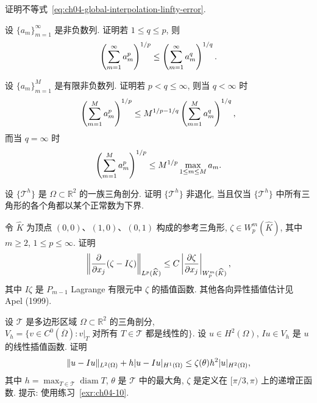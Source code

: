 \begin{MBExercise}
\label{exr:ch04-07}
证明不等式~\eqref{eq:ch04-global-interpolation-linfty-error}.
\end{MBExercise}

\begin{MBExercise}
\label{exr:ch04-08}
设 $\{a_m\}_{m=1}^\infty$ 是非负数列. 证明若 $1\leq q\leq p$, 则
\[
\MathBookFormulaID{formula-ch04-exercise-08-sequence-norm-monotonicity}
\left(\sum_{m=1}^\infty a_m^p\right)^{1/p}
\leq\left(\sum_{m=1}^\infty a_m^q\right)^{1/q}.
\]
\end{MBExercise}

\begin{MBExercise}
\label{exr:ch04-09}
设 $\{a_m\}_{m=1}^M$ 是有限非负数列. 证明若 $p<q\leq\infty$, 则当 $q<\infty$ 时
\[
\MathBookFormulaID{formula-ch04-exercise-09-finite-sequence-lp-lq}
\left(\sum_{m=1}^Ma_m^p\right)^{1/p}
\leq M^{1/p-1/q}\left(\sum_{m=1}^Ma_m^q\right)^{1/q},
\]
而当 $q=\infty$ 时
\[
\MathBookFormulaID{formula-ch04-exercise-09-finite-sequence-lp-linfty}
\left(\sum_{m=1}^Ma_m^p\right)^{1/p}
\leq M^{1/p}\max_{1\leq m\leq M}a_m.
\]
\end{MBExercise}

\begin{MBExercise}[最小角条件]
\label{exr:ch04-10}
设 $\{\mathcal T^h\}$ 是 $\Omega\subset\mathbb R^2$ 的一族三角剖分. 证明 $\{\mathcal T^h\}$ 非退化, 当且仅当 $\{\mathcal T^h\}$ 中所有三角形的各个角都以某个正常数为下界.
\end{MBExercise}

\begin{MBExercise}
\label{exr:ch04-11}
令 $\widehat K$ 为顶点 $(0,0)$、$(1,0)$、$(0,1)$ 构成的参考三角形, $\zeta\in W_p^m(\widehat K)$, 其中 $m\geq2$, $1\leq p\leq\infty$. 证明
\[
\MathBookFormulaID{formula-ch04-exercise-11-anisotropic-interpolation}
\left\|\frac{\partial}{\partial x_j}(\zeta-I\zeta)\right\|_{L^p(\widehat K)}
\leq C\left|\frac{\partial\zeta}{\partial x_j}\right|_{W_p^m(\widehat K)},
\]
其中 $I\zeta$ 是 $P_{m-1}$ Lagrange 有限元中 $\zeta$ 的插值函数. 其他各向异性插值估计见 Apel (1999).
\end{MBExercise}

\begin{MBExercise}[最大角条件]
\label{exr:ch04-12}
设 $\mathcal T$ 是多边形区域 $\Omega\subset\mathbb R^2$ 的三角剖分, $V_h=\{v\in C^0(\overline\Omega):v|_T\text{ 对所有 }T\in\mathcal T\text{ 都是线性的}\}$. 设 $u\in H^2(\Omega)$, $Iu\in V_h$ 是 $u$ 的线性插值函数. 证明
\[
\MathBookFormulaID{formula-ch04-exercise-12-maximum-angle-estimate}
\|u-Iu\|_{L^2(\Omega)}+h|u-Iu|_{H^1(\Omega)}
\leq\zeta(\theta)h^2|u|_{H^2(\Omega)},
\]
其中 $h=\max_{T\in\mathcal T}\operatorname{diam}T$, $\theta$ 是 $\mathcal T$ 中的最大角, $\zeta$ 是定义在 $[\pi/3,\pi)$ 上的递增正函数. 提示: 使用练习~\ref{exr:ch04-10}.
\end{MBExercise}


